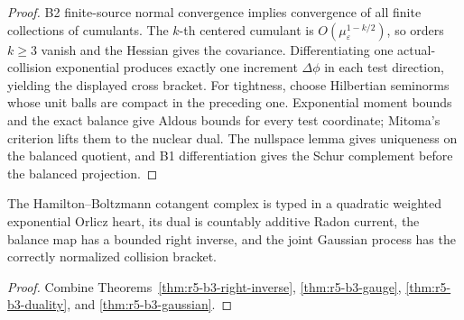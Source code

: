 \begin{proof}
B2 finite-source normal convergence implies convergence of all finite
collections of cumulants.  The \(k\)-th centered cumulant is
\(O(\mu_\varepsilon^{1-k/2})\), so orders \(k\ge3\) vanish and the Hessian
gives the covariance.  Differentiating one actual-collision exponential
produces exactly one increment \(\Delta\phi\) in each test direction, yielding
the displayed cross bracket.  For tightness, choose Hilbertian seminorms whose
unit balls are compact in the preceding one.  Exponential moment bounds and
the exact balance give Aldous bounds for every test coordinate; Mitoma's
criterion lifts them to the nuclear dual.  The nullspace lemma gives
uniqueness on the balanced quotient, and B1 differentiation gives the Schur
complement before the balanced projection.
\end{proof}

\begin{theorem}
\label{thm:r5-b3-main}
The Hamilton--Boltzmann cotangent complex is typed in a quadratic weighted
exponential Orlicz heart, its dual is countably additive Radon current, the
balance map has a bounded right inverse, and the joint Gaussian process has
the correctly normalized collision bracket.
\end{theorem}

\begin{proof}
Combine Theorems~\ref{thm:r5-b3-right-inverse},
\ref{thm:r5-b3-gauge}, \ref{thm:r5-b3-duality}, and
\ref{thm:r5-b3-gaussian}.
\end{proof}

